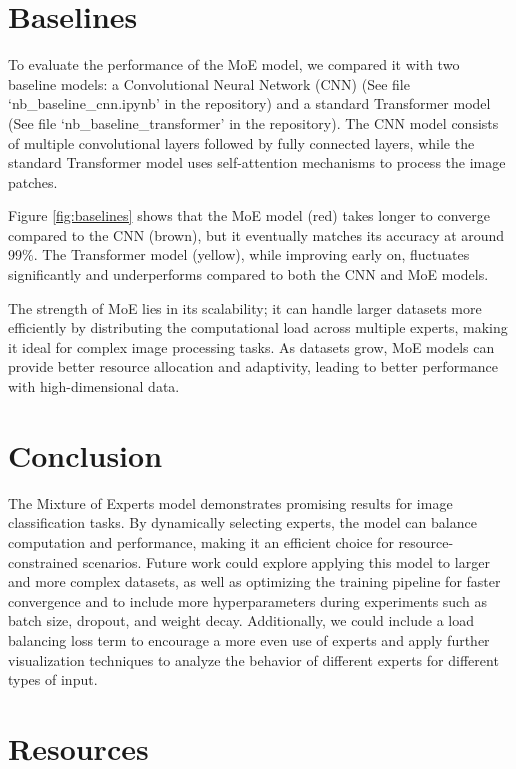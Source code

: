 \documentclass[a4paper,11pt]{article}
\begin{document}

\section{Baselines}
To evaluate the performance of the MoE model, we compared it with two baseline models: a Convolutional Neural Network (CNN) (See file `nb\_baseline\_cnn.ipynb' in the repository) and a standard Transformer model (See file `nb\_baseline\_transformer' in the repository). The CNN model consists of multiple convolutional layers followed by fully connected layers, while the standard Transformer model uses self-attention mechanisms to process the image patches.

Figure \ref{fig:baselines} shows that the MoE model (red) takes longer to converge compared to the CNN (brown), but it eventually matches its accuracy at around 99\%. The Transformer model (yellow), while improving early on, fluctuates significantly and underperforms compared to both the CNN and MoE models. 

The strength of MoE lies in its scalability; it can handle larger datasets more efficiently by distributing the computational load across multiple experts, making it ideal for complex image processing tasks. As datasets grow, MoE models can provide better resource allocation and adaptivity, leading to better performance with high-dimensional data.

\section{Conclusion}
The Mixture of Experts model demonstrates promising results for image classification tasks. By dynamically selecting experts, the model can balance computation and performance, making it an efficient choice for resource-constrained scenarios. Future work could explore applying this model to larger and more complex datasets, as well as optimizing the training pipeline for faster convergence and to include more hyperparameters during experiments such as batch size, dropout, and weight decay. Additionally, we could include a load balancing loss term to encourage a more even use of experts and apply further visualization techniques to analyze the behavior of different experts for different types of input.



\section{Resources}
\end{document}
